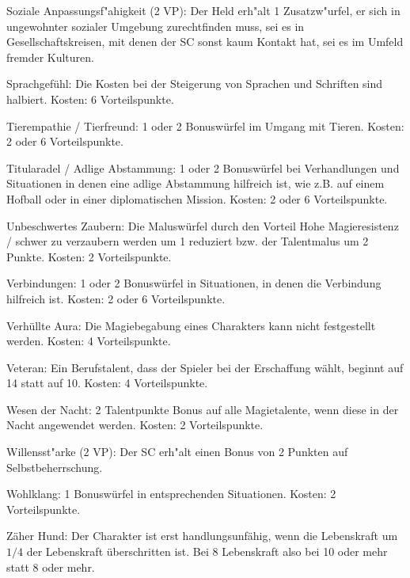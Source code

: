 \begin{description}
\item{Soziale Anpassungsf"ahigkeit (2 VP):} Der Held erh"alt 1 Zusatzw"urfel, er sich in ungewohnter sozialer Umgebung zurechtfinden muss, sei es in Gesellschaftskreisen, mit denen der SC sonst kaum Kontakt hat, sei es im Umfeld fremder Kulturen.

\item{Sprachgefühl:} Die Kosten bei der Steigerung von Sprachen und Schriften sind halbiert. Kosten: 6 Vorteilspunkte.

\item{Tierempathie / Tierfreund:} 1 oder 2 Bonuswürfel im Umgang mit Tieren. Kosten: 2 oder 6 Vorteilspunkte.

\item{Titularadel / Adlige Abstammung:} 1 oder 2 Bonuswürfel bei Verhandlungen und Situationen in denen eine adlige Abstammung hilfreich ist, wie z.B. auf einem Hofball oder in einer diplomatischen Mission. Kosten: 2 oder 6 Vorteilspunkte.

\item{Unbeschwertes Zaubern:} Die Maluswürfel durch den Vorteil Hohe Magieresistenz / schwer zu verzaubern werden um 1 reduziert bzw. der Talentmalus um 2 Punkte. Kosten: 2 Vorteilspunkte.

\item{Verbindungen:} 1 oder 2 Bonuswürfel in Situationen, in denen die Verbindung hilfreich ist. Kosten: 2 oder 6 Vorteilspunkte.

\item{Verhüllte Aura:} Die Magiebegabung eines Charakters kann nicht festgestellt werden. Kosten: 4 Vorteilspunkte.

\item{Veteran:} Ein Berufstalent, dass der Spieler bei der Erschaffung wählt, beginnt auf 14 statt auf 10. Kosten: 4 Vorteilspunkte.

\item{Wesen der Nacht:} 2 Talentpunkte Bonus auf alle Magietalente, wenn diese in der Nacht angewendet werden. Kosten: 2 Vorteilspunkte.

\item{Willensst"arke (2 VP):} Der SC erh"alt einen Bonus von 2 Punkten auf Selbstbeherrschung.

\item{Wohlklang:} 1 Bonuswürfel in entsprechenden Situationen. Kosten: 2 Vorteilspunkte.

\item{Zäher Hund:} Der Charakter ist erst handlungsunfähig, wenn die Lebenskraft um $1/4$ der Lebenskraft überschritten ist. Bei 8 Lebenskraft also bei 10 oder mehr statt 8 oder mehr.


\end{description}
